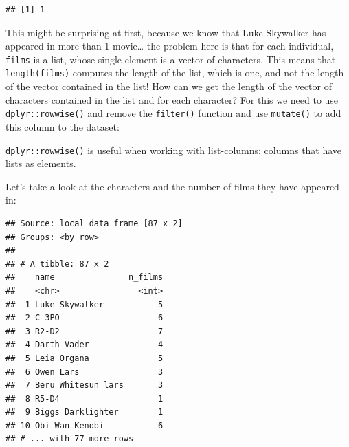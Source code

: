 \documentclass[]{gitbook}
\newenvironment{Shaded}{\begin{snugshade}}{\end{snugshade}}
\newcommand{\DataTypeTok}[1]{\textcolor[rgb]{0.13,0.29,0.53}{#1}}
\newcommand{\KeywordTok}[1]{\textcolor[rgb]{0.13,0.29,0.53}{\textbf{#1}}}
\newcommand{\NormalTok}[1]{#1}
\newcommand{\OperatorTok}[1]{\textcolor[rgb]{0.81,0.36,0.00}{\textbf{#1}}}
\newcommand{\StringTok}[1]{\textcolor[rgb]{0.31,0.60,0.02}{#1}}
\theoremstyle{definition}
\theoremstyle{definition}
\theoremstyle{definition}
\theoremstyle{remark}
\begin{document}
\begin{Shaded}
\end{Shaded}

\begin{verbatim}
## [1] 1
\end{verbatim}

This might be surprising at first, because we know that Luke Skywalker
has appeared in more than 1 movie\ldots{} the problem here is that for
each individual, \texttt{films} is a list, whose single element is a
vector of characters. This means that \texttt{length(films)} computes
the length of the list, which is one, and not the length of the vector
contained in the list! How can we get the length of the vector of
characters contained in the list and for each character? For this we
need to use \texttt{dplyr::rowwise()} and remove the \texttt{filter()}
function and use \texttt{mutate()} to add this column to the dataset:

\begin{Shaded}
\end{Shaded}

\texttt{dplyr::rowwise()} is useful when working with list-columns:
columns that have lists as elements.

Let's take a look at the characters and the number of films they have
appeared in:

\begin{Shaded}
\end{Shaded}

\begin{verbatim}
## Source: local data frame [87 x 2]
## Groups: <by row>
## 
## # A tibble: 87 x 2
##    name               n_films
##    <chr>                <int>
##  1 Luke Skywalker           5
##  2 C-3PO                    6
##  3 R2-D2                    7
##  4 Darth Vader              4
##  5 Leia Organa              5
##  6 Owen Lars                3
##  7 Beru Whitesun lars       3
##  8 R5-D4                    1
##  9 Biggs Darklighter        1
## 10 Obi-Wan Kenobi           6
## # ... with 77 more rows
\end{verbatim}
\end{document}
